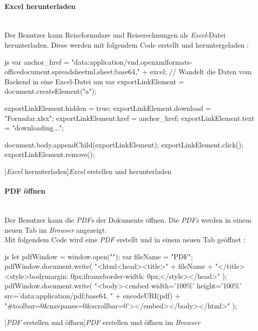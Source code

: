 \paragraph{Excel herunterladen}~\\
Der Benutzer kann Reiseformulare und Reiserechnungen als \textit{Excel}-Datei herunterladen. Diese werden mit folgendem Code erstellt und heruntergeladen \cite{down_excel}:
\begin{code}{js}
	var anchor_href =
	"data:application/vnd.openxmlformats-officedocument.spreadsheetml.sheet;base64," +
	excel;	// Wandelt die Daten vom Backend in eine Excel-Datei um
	var exportLinkElement = document.createElement("a");
	
	exportLinkElement.hidden = true;
	exportLinkElement.download = "Formular.xlsx";
	exportLinkElement.href = anchor_href;
	exportLinkElement.text = "downloading...";
	
	document.body.appendChild(exportLinkElement);
	exportLinkElement.click();
	exportLinkElement.remove();
\end{code}
[\textit{Excel} hernuterladen]{\textit{Excel} erstellen und herunterladen}~\\
\paragraph{PDF öffnen}~\\
Der Benutzer kann die \textit{PDFs} der Dokumente öffnen. Die \textit{PDFs} werden in einem neuen Tab im \textit{Browser} angezeigt.\\
Mit folgendem Code wird eine \textit{PDF} erstellt und in einem neuen Tab geöffnet \cite{sof_pdf}:
\begin{code}{js}
	let pdfWindow = window.open("");
	var fileName = "PDF";
	pdfWindow.document.write(
	"<html<head><title>" +
	fileName +
	"</title><style>body{margin: 0px;}iframe{border-width: 0px;}</style></head>"
	);
	pdfWindow.document.write(
	"<body><embed width='100\%' height='100\%' src='data:application/pdf;base64, " +
	encodeURI(pdf) +
	"#toolbar=0\&navpanes=0\&scrollbar=0'></embed></body></html>"
	);
\end{code}
[\textit{PDF} erstellen und öffnen]{\textit{PDF} erstellen und öffnen im \textit{Browser}}~
\newpage
